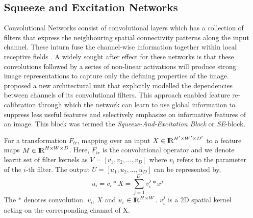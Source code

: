 \documentclass[fleqn,usenatbib]{mnras}
\begin{document}
\subsection{Squeeze and Excitation Networks}
\hspace{0.25 in}Convolutional Networks consist of convolutional layers which has a collection of filters that express the neighbouring spatial connectivity patterns along the input channel. These inturn fuse the channel-wise information together within local receptive fields \citep{hu2018squeeze}. A widely sought after effect for these networks is that these convolutions followed by a series of non-linear activations will produce strong image representations to capture only the defining properties of the image. \citet{hu2018squeeze} proposed a new architectural unit that explicitly modelled the dependencies between channels of its convolutional filters. This approach enabled feature re-calibration through which the network can learn to use global information to suppress less useful features and selectively emphasize on informative features of an image. This block was termed the \textit{Squeeze-And-Excitation Block} or \textit{SE}-block.

For a transformation $F_{tr}$, mapping over an input $X \in {\rm I\!R}^{H'\times W' \times D'}$ to a feature maps $M\in {\rm I\!R}^{H\times W \times D}$. Here, $F_{tr}$ is the convolutional operator and we denote learnt set of filter kernels as $V = [v_1, v_2, ..., v_D]$ where $v_i$ refers to the parameter of the $i$-th filter. The output $U = [u_1, u_2, ..., u_D]$ can be represented by,
\begin{equation}
    u_i = v_i \ast X = \sum_{j=1}^{D'}{v_i^j \ast x^j}
    \label{SE convolutional eqn}
\end{equation}
\hspace{0.25 in}The $\ast$ denotes convolution. $v_i$, $X$ and $u_i$ $\in {\rm I\!R}^{H\times W}$. $v_i^j$ is a 2D spatial kernel acting on the corresponding channel of X. 
\end{document}
